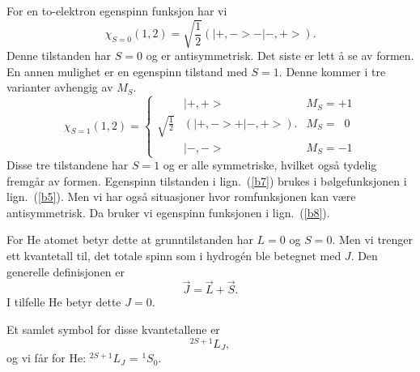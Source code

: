 For en to-elektron egenspinn funksjon har vi
%
\begin{equation}
\chi_{S = 0}(1,2) = 	\sqrt{\frac{1}{2}} \left (| +, - > - | -, + > \right ).
\label{b7}
\end{equation}
%
Denne tilstanden har $S = 0$ og er antisymmetrisk. Det siste er lett
{\aa} se av formen. En annen mulighet er en egenspinn tilstand med
$S = 1$. Denne kommer i tre varianter avhengig av $M_S$.
%
\begin{equation}
\chi_{S = 1}(1,2) = \left \{
	\begin{array}{rll}
	&|+, + >           &M_S = +1\\
	\sqrt{\frac{1}{2}} & \left (| +, - > + | -, + > \right ).
							&M_S = \;\; 0\\
	&| -, - >          &M_S = -1
	\end{array}
	\right .
\label{b8}
\end{equation}
%
Disse tre tilstandene har $S = 1$ og er alle symmetriske,
hvilket ogs{\aa} tydelig fremg{\aa}r av formen.
Egenspinn tilstanden i lign.~(\ref{b7}) brukes i b{\o}lgefunksjonen i lign.~(\ref{b5}).
Men vi har ogs{\aa} situasjoner hvor romfunksjonen kan v{\ae}re antisymmetrisk.
Da bruker vi egenspinn funksjonen i lign.~(\ref{b8}).

For He atomet betyr dette at grunntilstanden har $L = 0$ og $S = 0$.
Men vi trenger ett kvantetall
til, det totale spinn som  i hydrog\'{e}n ble betegnet med
$J$. Den generelle definisjonen er
%
\begin{equation}
\vec{J} = \vec{L} + \vec{S}.
\label{b9}
\end{equation}
%
I tilfelle He betyr dette $J = 0$.

Et samlet symbol for disse kvantetallene er
%
\begin{equation}
^{2 S + 1}L_J,
\label{b10}
\end{equation}
%
og vi f{\aa}r for He: $^{2 S + 1}L_J$ = $ ^{1}S_0$.


